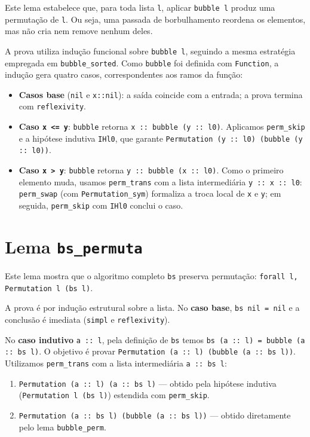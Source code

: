 \documentclass{article}
\begin{document}
Este lema estabelece que, para toda lista \texttt{l}, aplicar \texttt{bubble l}
produz uma permutação de \texttt{l}. Ou seja, uma passada de borbulhamento
reordena os elementos, mas não cria nem remove nenhum deles.

A prova utiliza indução funcional sobre \texttt{bubble l}, seguindo a mesma
estratégia empregada em \texttt{bubble\_sorted}.
Como \texttt{bubble} foi definida com \texttt{Function}, a indução gera quatro
casos, correspondentes aos ramos da função:

\begin{itemize}
  \item \textbf{Casos base} (\texttt{nil} e \texttt{x::nil}): a saída coincide
        com a entrada; a prova termina com \texttt{reflexivity}.
  \item \textbf{Caso \texttt{x <= y}}: \texttt{bubble} retorna
        \texttt{x :: bubble (y :: l0)}. Aplicamos \texttt{perm\_skip} e a
        hipótese indutiva \texttt{IHl0}, que garante
        \texttt{Permutation (y :: l0) (bubble (y :: l0))}.
  \item \textbf{Caso \texttt{x > y}}: \texttt{bubble} retorna
        \texttt{y :: bubble (x :: l0)}. Como o primeiro elemento muda, usamos
        \texttt{perm\_trans} com a lista intermediária \texttt{y :: x :: l0}:
        \texttt{perm\_swap} (com \texttt{Permutation\_sym}) formaliza a troca
        local de \texttt{x} e \texttt{y}; em seguida, \texttt{perm\_skip} com
        \texttt{IHl0} conclui o caso.
\end{itemize}

\section*{Lema \texttt{bs\_permuta}}

Este lema mostra que o algoritmo completo \texttt{bs} preserva permutação:
\texttt{forall l, Permutation l (bs l)}.

A prova é por indução estrutural sobre a lista.
No \textbf{caso base}, \texttt{bs nil = nil} e a conclusão é imediata
(\texttt{simpl} e \texttt{reflexivity}).

No \textbf{caso indutivo} \texttt{a :: l}, pela definição de \texttt{bs} temos
\texttt{bs (a :: l) = bubble (a :: bs l)}.
O objetivo é provar \texttt{Permutation (a :: l) (bubble (a :: bs l))}.
Utilizamos \texttt{perm\_trans} com a lista intermediária \texttt{a :: bs l}:

\begin{enumerate}
  \item \texttt{Permutation (a :: l) (a :: bs l)} --- obtido pela hipótese
        indutiva (\texttt{Permutation l (bs l)}) estendida com \texttt{perm\_skip}.
  \item \texttt{Permutation (a :: bs l) (bubble (a :: bs l))} --- obtido
        diretamente pelo lema \texttt{bubble\_perm}.
\end{enumerate}
\end{document}
